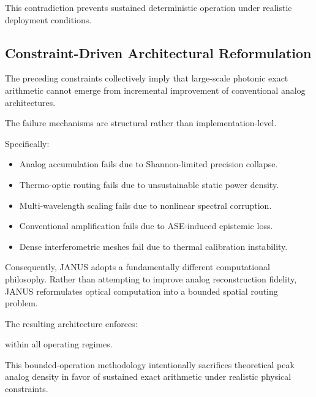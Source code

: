 \documentclass[journal]{IEEEtran}
\begin{document}
This contradiction prevents sustained deterministic operation under realistic deployment conditions.

\subsection{\textbf{Constraint-Driven Architectural Reformulation}}

The preceding constraints collectively imply that large-scale photonic exact arithmetic cannot emerge from incremental improvement of conventional analog architectures.

The failure mechanisms are structural rather than implementation-level.

Specifically:

\begin{itemize}
\item  Analog accumulation fails due to Shannon-limited precision collapse.
\item  Thermo-optic routing fails due to unsustainable static power density.
\item  Multi-wavelength scaling fails due to nonlinear spectral corruption.
\item  Conventional amplification fails due to ASE-induced epistemic loss.
\item  Dense interferometric meshes fail due to thermal calibration instability.
\end{itemize}

Consequently, JANUS adopts a fundamentally different computational philosophy. Rather than attempting to improve analog reconstruction fidelity, JANUS reformulates optical computation into a bounded spatial routing problem.

The resulting architecture enforces:

\begin{center}
\end{center}

\begin{center}
\end{center}

\begin{center}
\end{center}

within all operating regimes.

This bounded-operation methodology intentionally sacrifices theoretical peak analog density in favor of sustained exact arithmetic under realistic physical constraints.
\end{document}
